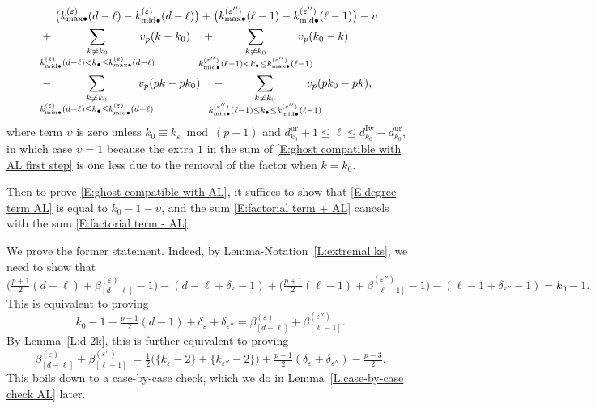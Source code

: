 \documentclass[12pt]{amsart}
\theoremstyle{definition}
\numberwithin{equation}{subsection}
\newcommand{\Iw}{\mathrm{Iw}}
\newcommand{\unr}{\mathrm{ur}}
\newcommand{\midd}{\mathrm{mid}}
\begin{document}
\begin{align}
\label{E:degree term AL}
&\big( k^{(\varepsilon)}_{{\max}\bullet}(d-\ell) - k^{(\varepsilon)}_{{\midd}\bullet}(d-\ell) \big)+ \big( k^{(\varepsilon'')}_{{\max}\bullet}(\ell-1) - k^{(\varepsilon'')}_{{\midd}\bullet}(\ell-1)\big) - \upsilon
\\
\label{E:factorial term + AL}
+\ & \hspace{-15pt}\sum_{\substack{k \neq k_0\\
k^{(\varepsilon)}_{\midd\bullet}(d-\ell) < k_\bullet \leq k^{(\varepsilon)}_{{\max}\bullet}(d-\ell)}}
\hspace{-15pt}v_p(k-k_0)\quad + \hspace{-15pt} \sum_{\substack{k \neq k_0\\
k^{(\varepsilon'')}_{{\midd}\bullet}(\ell-1) < k_\bullet \leq k^{(\varepsilon'')}_{{\max}\bullet}(\ell-1)}}
\hspace{-15pt}v_p(k_0-k)\quad 
\\
\label{E:factorial term - AL}
-\ & \hspace{-15pt} \sum_{\substack{k \neq k_0\\
k^{(\varepsilon)}_{{\min}\bullet}(d-\ell) \leq k_\bullet \leq k^{(\varepsilon)}_{{\midd}\bullet}(d-\ell)}}
\hspace{-15pt}v_p(pk-pk_0)\quad - \hspace{-15pt}\sum_{\substack{k \neq k_0\\
k^{(\varepsilon'')}_{{\min}\bullet}(\ell-1) \leq  k_\bullet \leq k^{(\varepsilon'')}_{{\midd}\bullet}(\ell-1)}}
\hspace{-15pt}v_p(pk_0-pk),
\end{align}
where term $\upsilon$ is zero unless $k_0 \equiv k_\varepsilon \bmod{(p-1)}$ and $d_{k_0}^\unr+1\leq  \ell\leq d_{k_0}^\Iw - d_{k_0}^\unr$,  in which case $\upsilon = 1$ because the extra $1$ in the sum of \eqref{E:ghost compatible with AL first step} is one less due to the removal of the factor when $k = k_0$.


Then to prove \eqref{E:ghost compatible with AL}, it suffices to show that \eqref{E:degree term AL} is equal to $k_0-1-\upsilon$, and the sum \eqref{E:factorial term + AL} cancels with the sum \eqref{E:factorial term - AL}.

We prove the former statement. Indeed, by Lemma-Notation~\ref{L:extremal ks}, we need to show that
$$
\big(\tfrac{p+1}2 (d-\ell) + \beta_{[d-\ell]}^{(\varepsilon)}-1\big) - (d-\ell + \delta_\varepsilon -1)  + \big(\tfrac{p+1}2 (\ell-1) + \beta_{[\ell-1]}^{(\varepsilon'')}-1\big) - (\ell-1 + \delta_{\varepsilon''} -1)=k_0-1.
$$
This is equivalent to proving
$$
k_0-1-\tfrac{p-1}2 (d-1) +\delta_\varepsilon + \delta_{\varepsilon''} = \beta_{[d-\ell]}^{(\varepsilon)} + \beta_{[\ell-1]}^{(\varepsilon'')}.
$$
By Lemma~\ref{L:d-2k}, this is further equivalent to proving
$$
\beta_{[d-\ell]}^{(\varepsilon)} + \beta_{[\ell-1]}^{(\varepsilon'')} \ =\tfrac12\big(\{k_\varepsilon - 2\} + \{k_{\varepsilon''}-2\} \big)  + \tfrac{p+1}2 (\delta_\varepsilon + \delta_{\varepsilon''}) -\tfrac{p-3}2.
$$
This boils down to a case-by-case check, which we do in Lemma~\ref{L:case-by-case check AL} later.
\end{document}
